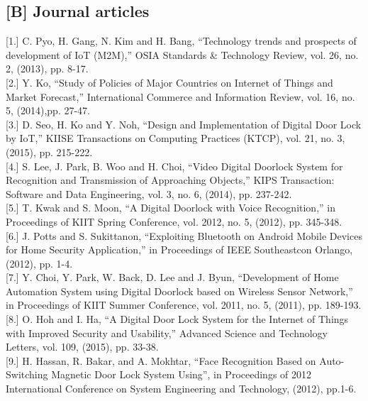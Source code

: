 \documentclass[twoside,a4paper,16pt]{book}
\begin{document}
{\subsection{[B] Journal articles}
	

[1.]	C. Pyo, H. Gang, N. Kim and H. Bang, “Technology trends and prospects 
	of development of IoT (M2M),” OSIA Standards \& Technology Review, vol. 26, no. 2, (2013), pp. 8-17.\\

{[2.]}	Y. Ko, “Study of Policies of Major Countries on Internet of Things and Market Forecast,” International Commerce and Information Review, vol. 16, no. 5, (2014),pp. 27-47.\\

{[3.]}	D.  Seo,  H.  Ko  and  Y.  Noh,  “Design  and  Implementation  of  Digital  Door  Lock  by  IoT,”  KIISE Transactions on Computing Practices (KTCP), vol. 21, no. 3, (2015), pp. 215-222.\\

[4.]	S. Lee, J. Park, B. Woo and H. Choi, “Video Digital Doorlock System for Recognition and Transmission of Approaching Objects,” KIPS Transaction: Software and Data Engineering, vol. 3, no. 6, (2014), pp. 237-242.\\

[5.]	T. Kwak and S. Moon, “A Digital Doorlock with Voice Recognition,” in Proceedings of KIIT Spring Conference, vol. 2012,  no. 5, (2012), pp. 345-348.\\

[6.]	J. Potts and S. Sukittanon, “Exploiting Bluetooth on Android Mobile Devices for Home Security Application,” in Proceedings of IEEE Southeastcon Orlango, (2012), pp. 1-4.\\

[7.]	Y. Choi, Y. Park, W. Back, D. Lee and J. Byun, “Development of Home Automation System using Digital Doorlock based on Wireless Sensor Network,” in Proceedings of KIIT Summer Conference, vol. 2011, no. 5, (2011), pp. 189-193.\\

[8.]	O. Hoh and I. Ha, “A Digital Door Lock System for the Internet of Things with Improved Security and Usability,” Advanced Science and Technology Letters, vol. 109, (2015), pp. 33-38.\\

[9.]	H. Hassan, R. Bakar, and A. Mokhtar, “Face Recognition Based on Auto-Switching Magnetic Door Lock System Using”, in Proceedings of 2012 International Conference on System Engineering and Technology, (2012), pp.1-6.\\

}
\end{document}
